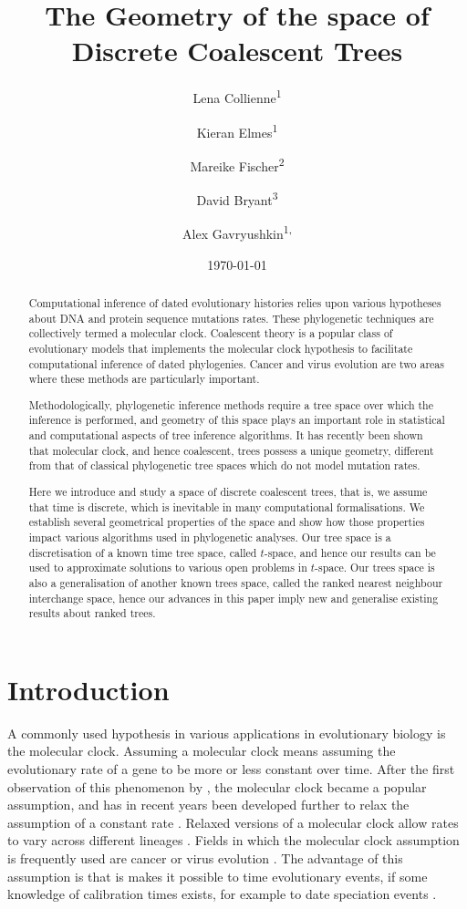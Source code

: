 \documentclass[11pt]{amsart}
\title[Geometry of ranked tree spaces]{The Geometry of the space of Discrete Coalescent Trees}
\date{\today}
\author{Lena Collienne\textsuperscript{1}}
\author{Kieran Elmes\textsuperscript{1}}
\author{Mareike Fischer\textsuperscript{2}}
\author{David Bryant\textsuperscript{3}}
\author{Alex Gavryushkin\textsuperscript{1, \Letter}}
\newcommand{\summary}[1]{} %
\begin{document}
\begin{abstract}
Computational inference of dated evolutionary histories relies upon various hypotheses about DNA and protein sequence mutations rates.
These phylogenetic techniques are collectively termed a molecular clock.
Coalescent theory is a popular class of evolutionary models that implements the molecular clock hypothesis to facilitate computational inference of dated phylogenies.
Cancer and virus evolution are two areas where these methods are particularly important.

Methodologically, phylogenetic inference methods require a tree space over which the inference is performed, and geometry of this space plays an important role in statistical and computational aspects of tree inference algorithms.
It has recently been shown that molecular clock, and hence coalescent, trees possess a unique geometry, different from that of classical phylogenetic tree spaces which do not model mutation rates.

Here we introduce and study a space of discrete coalescent trees, that is, we assume that time is discrete, which is inevitable in many computational formalisations.
We establish several geometrical properties of the space and show how those properties impact various algorithms used in phylogenetic analyses.
Our tree space is a discretisation of a known time tree space, called $t$-space, and hence our results can be used to approximate solutions to various open problems in $t$-space.
Our trees space is also a generalisation of another known trees space, called the ranked nearest neighbour interchange space, hence our advances in this paper imply new and generalise existing results about ranked trees.
\end{abstract}

\maketitle


\section{Introduction}

\summary{Molecular clock and divergence dating}
A commonly used hypothesis in various applications in evolutionary biology is the molecular clock.
Assuming a molecular clock means assuming the evolutionary rate of a gene to be more or less constant over time.
After the first observation of this phenomenon by \textcite{zuckerkandl1965evolutionary}, the molecular clock became a popular assumption, and has in recent years been developed further to relax the assumption of a constant rate \autocite{Kumar2016-eu}.
Relaxed versions of a molecular clock allow rates to vary across different lineages \autocite{Li2012-hf, Thorne1998-ev, Rambaut1998-kq}.
Fields in which the molecular clock assumption is frequently used are cancer \autocite{Alves2019-eo, Naxerova2015-qg} or virus evolution \autocite{Korber2000-sp}.
The advantage of this assumption is that is makes it possible to time evolutionary events, if some knowledge of calibration times exists, for example to date speciation events \autocite{Yoder2000-ks}.
\end{document}
